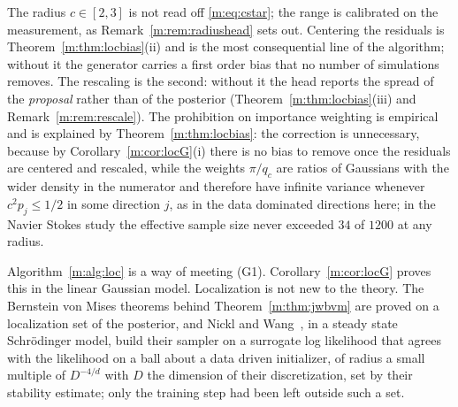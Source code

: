 The radius $c\in[2,3]$ is not read off \eqref{m:eq:cstar}; the range is calibrated on the measurement, as Remark~\ref{m:rem:radiushead} sets out. Centering the residuals is Theorem~\ref{m:thm:locbias}(ii) and is the most consequential line of the algorithm; without it the generator carries a first order bias that no number of simulations removes. The rescaling is the second: without it the head reports the spread of the \emph{proposal} rather than of the posterior (Theorem~\ref{m:thm:locbias}(iii) and Remark~\ref{m:rem:rescale}). The prohibition on importance weighting is empirical and is explained by Theorem~\ref{m:thm:locbias}: the correction is unnecessary, because by Corollary~\ref{m:cor:locG}(i) there is no bias to remove once the residuals are centered and rescaled, while the weights $\pi/q_c$ are ratios of Gaussians with the wider density in the numerator and therefore have infinite variance whenever $c^2p_j\le1/2$ in some direction $j$, as in the data dominated directions here; in the Navier Stokes study the effective sample size never exceeded $34$ of $1200$ at any radius.

Algorithm~\ref{m:alg:loc} is a way of meeting (G1). Corollary~\ref{m:cor:locG} proves this in the linear Gaussian model. Localization is not new to the theory. The Bernstein von Mises theorems behind Theorem~\ref{m:thm:jwbvm} are proved on a localization set of the posterior, and Nickl and Wang~\cite{nicklwang2024}, in a steady state Schr\"odinger model, build their sampler on a surrogate log likelihood that agrees with the likelihood on a ball about a data driven initializer, of radius a small multiple of $D^{-4/d}$ with $D$ the dimension of their discretization, set by their stability estimate; only the training step had been left outside such a set.

